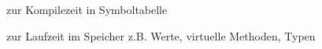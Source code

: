 %
%
 zur Kompilezeit in Symboltabelle

 zur Laufzeit im Speicher z.B. Werte, virtuelle Methoden, Typen

%
%
